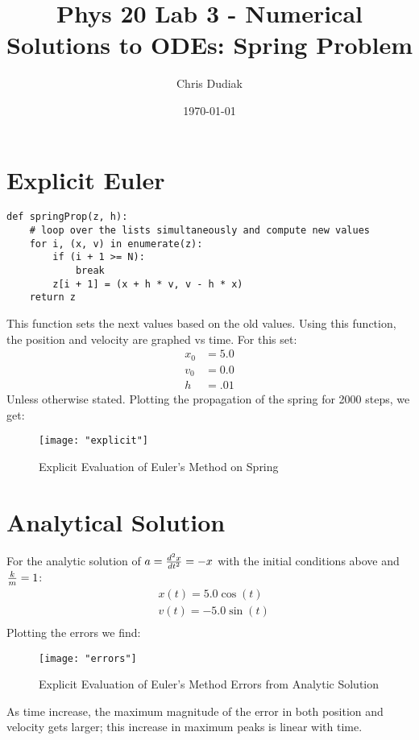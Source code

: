 \documentclass{article}
\begin{document}
\title{Phys 20 Lab 3 - Numerical Solutions to ODEs: Spring Problem}
\author{Chris Dudiak}
\date{\today}
\maketitle

\section{Explicit Euler}
\begin{verbatim}
def springProp(z, h):
    # loop over the lists simultaneously and compute new values
    for i, (x, v) in enumerate(z):
        if (i + 1 >= N):
            break
        z[i + 1] = (x + h * v, v - h * x)
    return z
\end{verbatim}
This function sets the next values based on the old values. Using this function, the position and velocity are graphed vs time. For this set:
\begin{align*}
	x_0 &= 5.0\\
	v_0 &= 0.0\\
	h &= .01
\end{align*}
Unless otherwise stated. Plotting the propagation of the spring for 2000 steps, we get:

\begin{figure}[h!]
	\centering
	\texttt{[image: "explicit"]}
	\caption{Explicit Evaluation of Euler's Method on Spring}
\end{figure} 

\FloatBarrier
\section{Analytical Solution}
For the analytic solution of $a = {d^2x \over dt^2} = -x$ with the initial conditions above and ${k\over m}  = 1$:
\begin{align*}
	&x(t) = 5.0\cos(t)\\
	&v(t) = -5.0\sin(t)\\
\end{align*}
Plotting the errors we find:
\begin{figure}[h!]
	\centering
	\texttt{[image: "errors"]}
	\caption{Explicit Evaluation of Euler's Method Errors from Analytic Solution}
\end{figure} 
\FloatBarrier
As time increase, the maximum magnitude of the error in both position and velocity gets larger; this increase in maximum peaks is linear 
with time.
\end{document}
